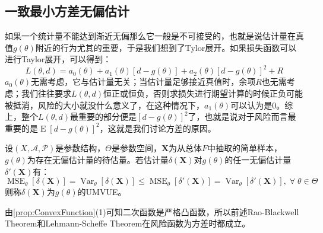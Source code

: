 \subsection{一致最小方差无偏估计}
\begin{note}
	如果一个统计量不能达到渐近无偏那么它一般是不可接受的，也就是说估计量在真值$g(\theta)$附近的行为尤其的重要，于是我们想到了Tylor展开。如果损失函数可以进行Taylor展开，可以得到：
	\begin{equation*}
		L(\theta,d)=a_0(\theta)+a_1(\theta)[d-g(\theta)]+a_2(\theta)[d-g(\theta)]^2+R
	\end{equation*}
	$a_0(\theta)$无需考虑，它与估计量无关；当估计量足够接近真值时，余项$R$也无需考虑；我们往往要求$L(\theta,d)$恒正或恒负，否则求损失进行期望计算的时候正负可能被抵消，风险的大小就没什么意义了，在这种情况下，$a_1(\theta)$可以认为是$0$。综上，整个$L(\theta,d)$最重要的部分便是$[d-g(\theta)]^2$了，也就是说对于风险而言最重要的是$\operatorname{E}[d-g(\theta)]^2$，这就是我们讨论方差的原因。
\end{note}
\begin{definition}
	设$(X,\mathscr{A},\mathscr{P})$是参数结构，$\Theta$是参数空间，$\mathbf{X}$为从总体$F$中抽取的简单样本，$g(\theta)$为存在无偏估计量的待估量。若估计量$\delta(\mathbf{X})$对$g(\theta)$的任一无偏估计量$\delta'(\mathbf{X})$有：
	\begin{equation*}
		\operatorname{MSE}_{\theta}[\delta(\mathbf{X})]=\operatorname{Var}_{\theta}[\delta(\mathbf{X})]\leqslant\operatorname{MSE}_{\theta}[\delta'(\mathbf{X})]=\operatorname{Var}_{\theta}[\delta'(\mathbf{X})],\;\forall\;\theta\in\Theta
	\end{equation*}
	则称$\delta(\mathbf{X})$为$g(\theta)$的\gls{UMVUE}。
\end{definition}
\begin{note}
	由\cref{prop:ConvexFunction}(1)可知二次函数是严格凸函数，所以前述Rao-Blackwell Theorem和Lehmann-Scheffe Theorem在风险函数为方差时都成立。
\end{note}
